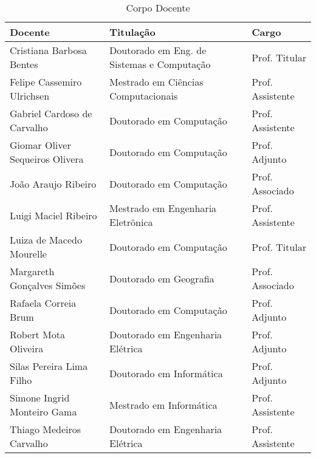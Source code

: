 \begin{table}
    \centering
    \caption{Corpo Docente}
    \label{CorpoDocente}
    \begin{tabular}{lll}
        \hline
        \rowcolor{gray!20}
        {\textbf{Docente}}              & \textbf{Titulação}                         & \textbf{Cargo}   \\
        \hline
        Cristiana Barbosa Bentes        & Doutorado em Eng. de Sistemas e Computação & Prof. Titular    \\
        Felipe Cassemiro Ulrichsen      & Mestrado em Ciências Computacionais        & Prof. Assistente \\
        Gabriel Cardoso de Carvalho     & Doutorado em Computação                    & Prof. Assistente \\
        Giomar Oliver Sequeiros Olivera & Doutorado em Computação                    & Prof. Adjunto    \\
        João Araujo Ribeiro             & Doutorado em Computação                    & Prof. Associado  \\
        Luigi Maciel Ribeiro            & Mestrado em Engenharia Eletrônica          & Prof. Assistente \\
        Luiza de Macedo Mourelle        & Doutorado em Computação                    & Prof. Titular    \\
        Margareth Gonçalves Simões      & Doutorado em Geografia                     & Prof. Associado  \\
        Rafaela Correia Brum            & Doutorado em Computação                    & Prof. Adjunto    \\
        Robert Mota Oliveira            & Doutorado em Engenharia Elétrica           & Prof. Adjunto    \\
        Silas Pereira Lima Filho        & Doutorado em Informática                   & Prof. Adjunto    \\
        Simone Ingrid Monteiro Gama     & Mestrado em Informática                    & Prof. Assistente \\
        Thiago Medeiros Carvalho        & Doutorado em Engenharia Elétrica           & Prof. Assistente \\
        \hline
    \end{tabular}
\end{table}


